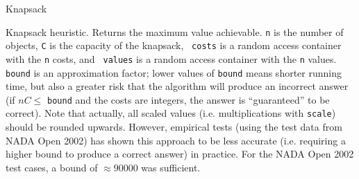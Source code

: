 \categorycontents{}



\begin{algorithm}{Knapsack}

\desc
Knapsack heuristic. Returns the maximum value achievable. {\tt n} is
the number of objects, {\tt C} is the capacity of the knapsack, {\tt
costs} is a random access container with the {\tt n} costs, and {\tt
values} is a random access container with the {\tt n} values. {\tt
bound} is an approximation factor; lower values of {\tt bound} means
shorter running time, but also a greater risk that the algorithm will
produce an incorrect answer (if $nC \le $ {\tt bound} and the costs
are integers, the answer is ``guaranteed'' to be correct). Note that
actually, all scaled values (i.e. multiplications with {\tt scale})
should be rounded upwards. However, empirical tests (using the test
data from NADA Open 2002) has shown this approach to be less accurate
(i.e. requiring a higher bound to produce a correct answer) in
practice. For the NADA Open 2002 test cases, a bound of $\approx
90000$ was sufficient.

\end{algorithm}


\begin{sourceslandscape}
\end{sourceslandscape}
